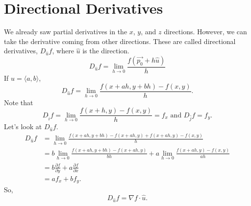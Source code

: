 \section{Directional Derivatives}
\noindent
We already saw partial derivatives in the $x$, $y$, and $z$ directions.
However, we can take the derivative coming from other directions.
These are called directional derivatives, $D_{\hat{u}}{f}$, where $\hat{u}$ is the direction.
\begin{equation*}
	D_{\hat{u}}{f} = \lim_{h \to 0}{\frac{f(\vec{p_0} + h\hat{u})}{h}}
\end{equation*}
\noindent
If $\hat{u} = \langle a, b \rangle$, 
\begin{equation*}
	D_{\hat{u}}{f} = \lim_{h \to 0}{\frac{f(x+ah, y+bh) - f(x,y)}{h}}.
\end{equation*}
Note that
\begin{equation*}
	D_{\hat{i}}{f} = \lim_{h \to 0}{\frac{f(x+h, y) - f(x, y)}{h}} = f_x \text{ and } D_{\hat{j}}{f} = f_y.
\end{equation*}
Let's look at $D_{\hat{u}}{f}$.
\begin{align*}
	D_{\hat{u}}{f} &= \lim_{h \to 0}{\frac{f(x+ah, y+bh) - f(x+ah, y) + f(x+ah, y) - f(x, y)}{h}} \\
	&= b\lim_{h \to 0}{\frac{f(x+ah, y+bh)-f(x+ah, y)}{bh}} + a\lim_{h \to 0}{\frac{f(x+ah, y) - f(x, y)}{ah}} \\
	&= b\frac{\partial f}{\partial y} + a\frac{\partial f}{\partial x} \\
	&= af_x + bf_y.
\end{align*}
So, 
\begin{equation*}
	D_{\hat{u}}{f} =\nabla f \cdot \hat{u}.
\end{equation*}
